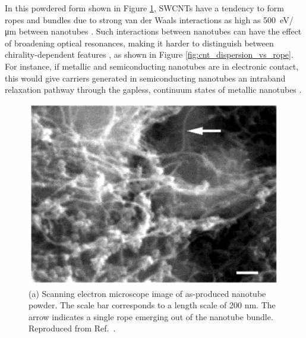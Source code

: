 In this powdered form shown in Figure \ref{fig:cnt_powder}, SWCNTs have a tendency to form ropes and bundles due to strong van der Waals interactions as high as \SI{500}{\electronvolt / \micro \meter} between nanotubes \cite{thess1996crystalline, girifalco2000carbon}. Such interactions between nanotubes can have the effect of broadening optical resonances, making it harder to distinguish between chirality-dependent features \cite{liu1998fullerene, o2001reversible, o2002band}, as shown in Figure \ref{fig:cnt_dispersion_vs_rope}. For instance, if metallic and semiconducting nanotubes are in electronic contact, this would give carriers generated in semiconducting nanotubes an intraband relaxation pathway through the gapless, continuum states of metallic nanotubes \cite{ostojic2004interband}.


\begin{figure}[ht]
	\centering
	\includegraphics[scale=0.3]{images/chapter_methods/sem_cnt_powder_bandy}
	\caption{(a) Scanning electron microscope image of as-produced nanotube powder. The scale bar corresponds to a length scale of 200 nm. The arrow indicates a single rope emerging out of the nanotube bundle. Reproduced from Ref.\ \cite{bandyopadhyaya2002stabilization}.}
	\label{fig:cnt_powder}
\end{figure}

